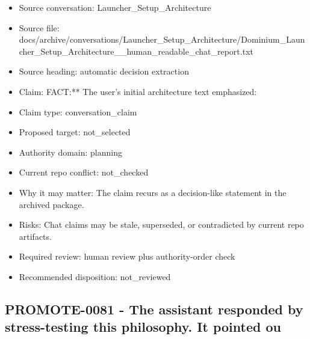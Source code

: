 \documentclass[11pt,a4paper]{report}
\begin{document}
\begin{itemize}
\item Source conversation: Launcher\_Setup\_Architecture
\item Source file: docs/archive/conversations/Launcher\_Setup\_Architecture/Dominium\_Launcher\_Setup\_Architecture\_\_human\_readable\_chat\_report.txt
\item Source heading: automatic decision extraction
\item Claim: FACT:** The user's initial architecture text emphasized:
\item Claim type: conversation\_claim
\item Proposed target: not\_selected
\item Authority domain: planning
\item Current repo conflict: not\_checked
\item Why it may matter: The claim recurs as a decision-like statement in the archived package.
\item Risks: Chat claims may be stale, superseded, or contradicted by current repo artifacts.
\item Required review: human review plus authority-order check
\item Recommended disposition: not\_reviewed
\end{itemize}

\subsection{PROMOTE-0081 - The assistant responded by stress-testing this philosophy. It pointed ou}
\end{document}
